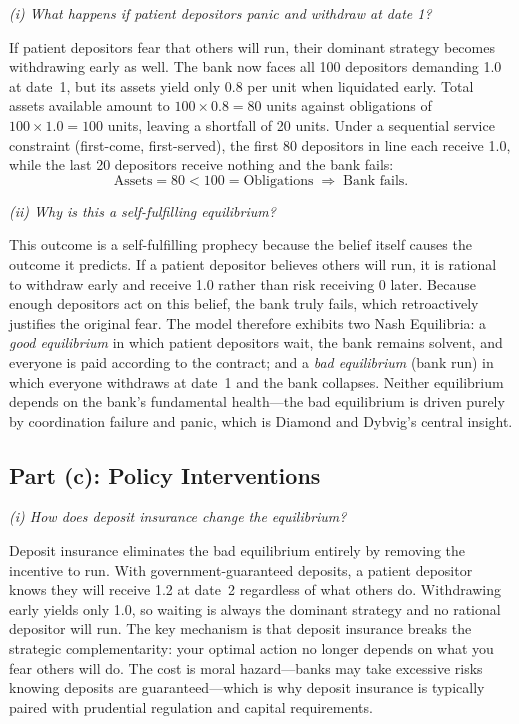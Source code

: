 \documentclass[a4paper]{article}
\begin{document}
\textit{(i) What happens if patient depositors panic and withdraw at date 1?}

If patient depositors fear that others will run, their dominant strategy
becomes withdrawing early as well. The bank now faces all 100 depositors
demanding 1.0 at date~1, but its assets yield only 0.8 per unit when
liquidated early. Total assets available amount to \(100 \times 0.8 = 80\)
units against obligations of \(100 \times 1.0 = 100\) units, leaving a
shortfall of 20 units. Under a sequential service constraint (first-come,
first-served), the first 80 depositors in line each receive 1.0, while the
last 20 depositors receive nothing and the bank fails:
\[
\text{Assets} = 80 < 100 = \text{Obligations} \;\Rightarrow\; \text{Bank fails.}
\]

\textit{(ii) Why is this a self-fulfilling equilibrium?}

This outcome is a self-fulfilling prophecy because the belief itself causes
the outcome it predicts. If a patient depositor believes others will run, it
is rational to withdraw early and receive 1.0 rather than risk receiving 0
later. Because enough depositors act on this belief, the bank truly fails,
which retroactively justifies the original fear. The model therefore
exhibits two Nash Equilibria: a \emph{good equilibrium} in which patient
depositors wait, the bank remains solvent, and everyone is paid according to
the contract; and a \emph{bad equilibrium} (bank run) in which everyone
withdraws at date~1 and the bank collapses. Neither equilibrium depends on
the bank's fundamental health---the bad equilibrium is driven purely by
coordination failure and panic, which is Diamond and Dybvig's central
insight.

\subsection{Part (c): Policy Interventions}

\textit{(i) How does deposit insurance change the equilibrium?}

Deposit insurance eliminates the bad equilibrium entirely by removing the
incentive to run. With government-guaranteed deposits, a patient depositor
knows they will receive 1.2 at date~2 regardless of what others do.
Withdrawing early yields only 1.0, so waiting is always the dominant
strategy and no rational depositor will run. The key mechanism is that
deposit insurance breaks the strategic complementarity: your optimal action
no longer depends on what you fear others will do. The cost is moral
hazard---banks may take excessive risks knowing deposits are
guaranteed---which is why deposit insurance is typically paired with
prudential regulation and capital requirements.
\end{document}
